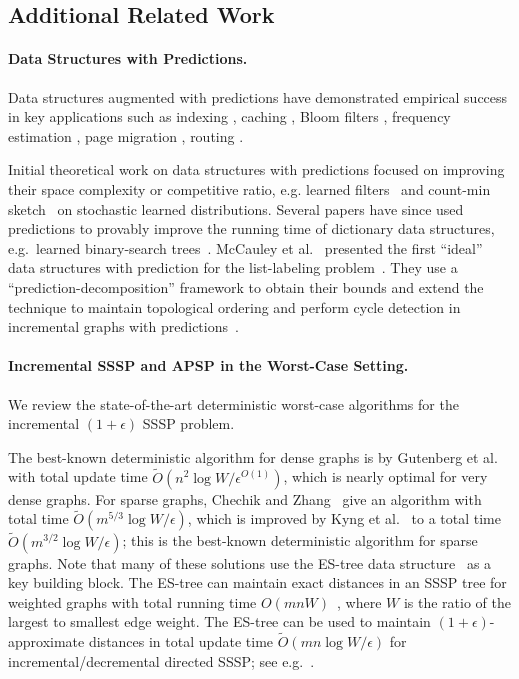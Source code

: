 \subsection{Additional Related Work}\label{sec:related}

\paragraph{Data Structures with Predictions.}

Data structures augmented with predictions have demonstrated empirical success in key applications such as indexing \cite{KraskaBCDP18,ding2020alex,DaiXGA20}, caching \cite{JiangP020,LykourisVassilvitskii21}, 
Bloom filters \cite{mitzenmacher2018model,vaidya2020partitioned}, frequency estimation \cite{hsu2019learning}, page migration \cite{IndykMMR22}, routing \cite{BhaskaraGKM20}.  

Initial theoretical work on data structures with predictions focused on improving their space complexity or competitive ratio, e.g. learned filters~\cite{vaidya2020partitioned,mitzenmacher2018model,bercea2022daisy} and count-min sketch~\cite{hsu2019learning,du2021putting} on stochastic learned distributions.  Several papers have since used predictions to provably improve the running time of dictionary data structures, e.g.\ learned binary-search trees~\cite{lin2022learning, chen2022power, zeynalirobust,dinitz2024binary}.  McCauley et al.~\cite{McCauleyMNS23} presented the first ``ideal'' data structures with prediction for the list-labeling problem~\cite{McCauleyMNS23}. They use a ``prediction-decomposition'' framework to obtain their bounds and extend the technique to maintain topological ordering and perform cycle detection in incremental graphs with predictions~\cite{McCauleyMoNi24}.

\paragraph{Incremental SSSP and APSP in the Worst-Case Setting.} 
We review the state-of-the-art deterministic worst-case algorithms for the incremental $(1+\epsilon)$ SSSP problem.  

The best-known deterministic algorithm for dense graphs is by Gutenberg et al.~\cite{probst2020new} with total update time $\tilde{O}(n^2 \log W/\epsilon^{O(1)})$, which is nearly optimal for very dense graphs.  For sparse graphs,
Chechik and Zhang~\cite{chechik2021incremental} give an algorithm with total time $\tilde{O}(m^{5/3}\log W/\epsilon)$, which is improved by 
Kyng et al.~\cite{KyngMeGu22} to a total time $\tilde{O}(m^{3/2}\log W /\epsilon)$; this is the best-known deterministic algorithm for sparse graphs.  Note that many of these solutions use the ES-tree data structure~\cite{shiloach1981line} as a key building block. The ES-tree can maintain exact distances in an SSSP tree for weighted graphs with total running time $O(mnW)$~\cite{henzinger1995fully}, where $W$ is the ratio of the largest to smallest edge weight. The ES-tree can be used to maintain $(1+\epsilon)$-approximate distances in total update time $\tilde{O}(mn\log W/\epsilon)$ for incremental/decremental directed SSSP; see e.g.~\cite{bernstein2009fully,bernstein2016maintaining,madry2010faster}.

